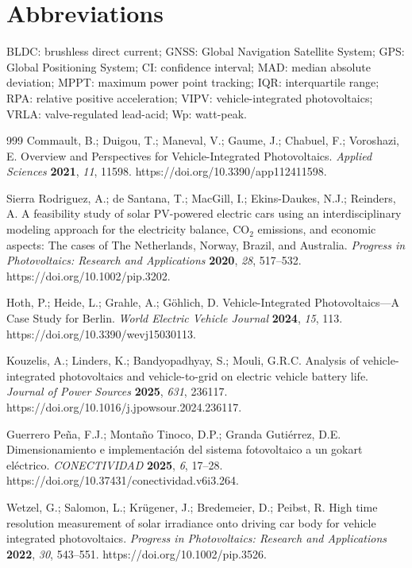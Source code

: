 \documentclass[vehicles,article,submit,moreauthors]{Definitions/mdpi}
\begin{document}
\section*{Abbreviations}
\noindent
BLDC: brushless direct current; GNSS: Global Navigation Satellite System; GPS: Global Positioning System; CI: confidence interval; MAD: median absolute deviation; MPPT: maximum power point tracking; IQR: interquartile range; RPA: relative positive acceleration; VIPV: vehicle-integrated photovoltaics; VRLA: valve-regulated lead-acid; Wp: watt-peak.

\begin{thebibliography}{999}
    Commault, B.; Duigou, T.; Maneval, V.; Gaume, J.; Chabuel, F.; Voroshazi, E. Overview and Perspectives for Vehicle-Integrated Photovoltaics. \textit{Applied Sciences} \textbf{2021}, \textit{11}, 11598. https://doi.org/10.3390/app112411598.

    Sierra Rodriguez, A.; de Santana, T.; MacGill, I.; Ekins-Daukes, N.J.; Reinders, A. A feasibility study of solar PV-powered electric cars using an interdisciplinary modeling approach for the electricity balance, CO$_2$ emissions, and economic aspects: The cases of The Netherlands, Norway, Brazil, and Australia. \textit{Progress in Photovoltaics: Research and Applications} \textbf{2020}, \textit{28}, 517--532. https://doi.org/10.1002/pip.3202.

    Hoth, P.; Heide, L.; Grahle, A.; Göhlich, D. Vehicle-Integrated Photovoltaics---A Case Study for Berlin. \textit{World Electric Vehicle Journal} \textbf{2024}, \textit{15}, 113. https://doi.org/10.3390/wevj15030113.

    Kouzelis, A.; Linders, K.; Bandyopadhyay, S.; Mouli, G.R.C. Analysis of vehicle-integrated photovoltaics and vehicle-to-grid on electric vehicle battery life. \textit{Journal of Power Sources} \textbf{2025}, \textit{631}, 236117. https://doi.org/10.1016/j.jpowsour.2024.236117.

    Guerrero Peña, F.J.; Montaño Tinoco, D.P.; Granda Gutiérrez, D.E. Dimensionamiento e implementación del sistema fotovoltaico a un gokart eléctrico. \textit{CONECTIVIDAD} \textbf{2025}, \textit{6}, 17--28. https://doi.org/10.37431/conectividad.v6i3.264.

    Wetzel, G.; Salomon, L.; Krügener, J.; Bredemeier, D.; Peibst, R. High time resolution measurement of solar irradiance onto driving car body for vehicle integrated photovoltaics. \textit{Progress in Photovoltaics: Research and Applications} \textbf{2022}, \textit{30}, 543--551. https://doi.org/10.1002/pip.3526.


\end{thebibliography}
\end{document}
